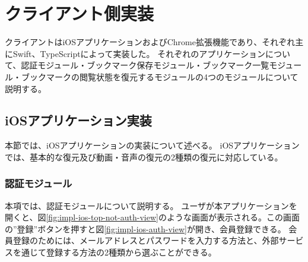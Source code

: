 

\section{クライアント側実装}
クライアントはiOSアプリケーションおよびChrome拡張機能であり、それぞれ主にSwift、TypeScriptによって実装した。
それぞれのアプリケーションについて、認証モジュール・ブックマーク保存モジュール・ブックマーク一覧モジュール・ブックマークの閲覧状態を復元するモジュールの4つのモジュールについて説明する。

\subsection{iOSアプリケーション実装}
本節では、iOSアプリケーションの実装について述べる。
iOSアプリケーションでは、基本的な復元及び動画・音声の復元の2種類の復元に対応している。

\subsubsection{認証モジュール}
本項では、認証モジュールについて説明する。
ユーザが本アプリケーションを開くと、図\ref{fig:impl-ios-top-not-auth-view}のような画面が表示される。この画面の”登録”ボタンを押すと図\ref{fig:impl-ios-auth-view}が開き、会員登録できる。
会員登録のためには、メールアドレスとパスワードを入力する方法と、外部サービスを通じて登録する方法の2種類から選ぶことができる。

